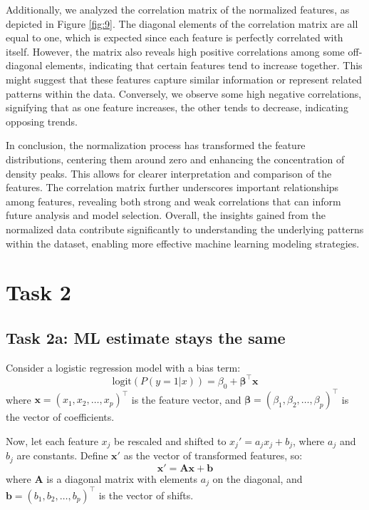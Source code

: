 \documentclass[a4paper,oneside,bibliography=totoc]{scrartcl}
\begin{document}
Additionally, we analyzed the correlation matrix of the normalized features, as depicted in Figure \ref{fig:9}. The diagonal elements of the correlation matrix are all equal to one, which is expected since each feature is perfectly correlated with itself. However, the matrix also reveals high positive correlations among some off-diagonal elements, indicating that certain features tend to increase together. This might suggest that these features capture similar information or represent related patterns within the data. Conversely, we observe some high negative correlations, signifying that as one feature increases, the other tends to decrease, indicating opposing trends.

In conclusion, the normalization process has transformed the feature distributions, centering them around zero and enhancing the concentration of density peaks. This allows for clearer interpretation and comparison of the features. The correlation matrix further underscores important relationships among features, revealing both strong and weak correlations that can inform future analysis and model selection. Overall, the insights gained from the normalized data contribute significantly to understanding the underlying patterns within the dataset, enabling more effective machine learning modeling strategies.




\section{Task 2}

\subsection{Task 2a: ML estimate stays the same}

Consider a logistic regression model with a bias term:
\[
\text{logit}(P(y=1|x)) = \beta_0 + \mathbf{\beta}^\top \mathbf{x}
\]
where \( \mathbf{x} = (x_1, x_2, \ldots, x_p)^\top \) is the feature vector, and \( \mathbf{\beta} = (\beta_1, \beta_2, \ldots, \beta_p)^\top \) is the vector of coefficients. 

Now, let each feature \( x_j \) be rescaled and shifted to \( x_j' = a_j x_j + b_j \), where \( a_j \) and \( b_j \) are constants. Define \( \mathbf{x}' \) as the vector of transformed features, so:
\[
\mathbf{x}' = \mathbf{A} \mathbf{x} + \mathbf{b}
\]
where \( \mathbf{A} \) is a diagonal matrix with elements \( a_j \) on the diagonal, and \( \mathbf{b} = (b_1, b_2, \ldots, b_p)^\top \) is the vector of shifts.
\end{document}
